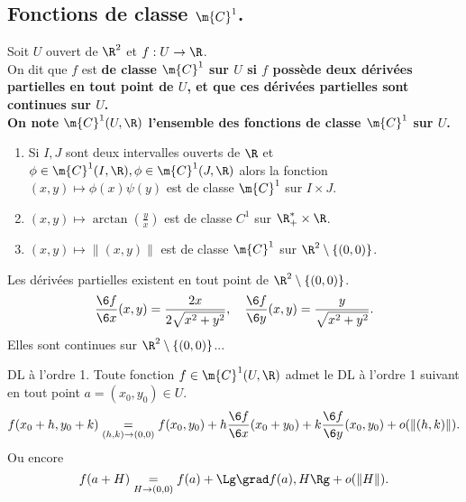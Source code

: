 \documentclass[11pt]{article}
\renewcommand*{\C}{\m{C}}
\begin{document}
\subsection{Fonctions de classe \texorpdfstring{$\C^1$}{Lg}.}

\begin{defi}{}{}
    Soit $U$ ouvert de $\R^2$ et $f:U\to\R$.\\
    On dit que $f$ est \bf{de classe} $\C^1$ sur $U$ si $f$ possède deux dérivées partielles en tout point de $U$, \bf{et} que ces dérivées partielles sont continues sur $U$.\\
    On note $\C^1(U,\R)$ l'ensemble des fonctions de classe $\C^1$ sur $U$.
\end{defi}

\begin{ex}{}{}
    \begin{enumerate}[topsep=0pt,itemsep=-0.9 ex]
        \item Si $I,J$ sont deux intervalles ouverts de $\R$ et $\phi\in\C^1(I,\R),\phi\in\C^1(J,\R)$ alors la fonction $(x,y)\mapsto\phi(x)\psi(y)$ est de classe $\C^1$ sur $I\times J$.
        \item $(x,y)\mapsto \arctan(\frac{y}{x})$ est de classe $C^1$ sur $\R_+^*\times\R$.
        \item $(x,y)\mapsto \|(x,y)\|$ est de classe $\C^1$ sur $\R^2\setminus\{(0,0)\}$.
    \end{enumerate}
    \tcblower
     Les dérivées partielles existent en tout point de $\R^2\setminus\{(0,0)\}$.
    \begin{equation*}
        \frac{\6 f}{\6 x}(x,y)=\frac{2x}{2\sqrt{x^2+y^2}}, \quad \frac{\6 f}{\6 y}(x,y)=\frac{y}{\sqrt{x^2+y^2}}.
    \end{equation*}
    Elles sont continues sur $\R^2\setminus\{(0,0)\}$... 
\end{ex}

\begin{prop}{DL à l'ordre 1.}{}
    Toute fonction $f\in\C^1(U,\R)$ admet le DL à l'ordre 1 suivant en tout point $a=(x_0,y_0)\in U$.
    \begin{equation*}
        f(x_0+h, y_0+k)\underset{(h,k)\to(0,0)}{=}f(x_0,y_0)+h\frac{\6 f}{\6 x}(x_0+y_0)+k\frac{\6 f}{\6 y}(x_0,y_0)+o(\|(h,k)\|).
    \end{equation*}
    Ou encore
    \begin{equation*}
        f(a+H)\underset{H\to(0,0)}{=}f(a)+\Lg \grad f(a), H \Rg + o(\|H\|).
    \end{equation*}
\end{prop}
\end{document}
